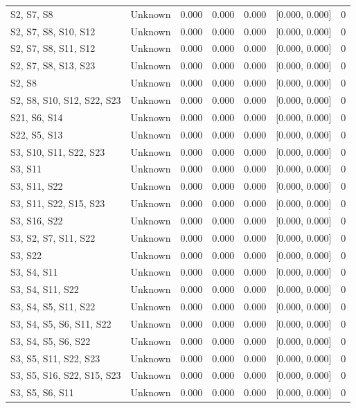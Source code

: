\begin{table}[h]
\begin{tabular}{llccccr}
S2, S7, S8 & Unknown & 0.000 & 0.000 & 0.000 & [0.000, 0.000] & 0 \\
S2, S7, S8, S10, S12 & Unknown & 0.000 & 0.000 & 0.000 & [0.000, 0.000] & 0 \\
S2, S7, S8, S11, S12 & Unknown & 0.000 & 0.000 & 0.000 & [0.000, 0.000] & 0 \\
S2, S7, S8, S13, S23 & Unknown & 0.000 & 0.000 & 0.000 & [0.000, 0.000] & 0 \\
S2, S8 & Unknown & 0.000 & 0.000 & 0.000 & [0.000, 0.000] & 0 \\
S2, S8, S10, S12, S22, S23 & Unknown & 0.000 & 0.000 & 0.000 & [0.000, 0.000] & 0 \\
S21, S6, S14 & Unknown & 0.000 & 0.000 & 0.000 & [0.000, 0.000] & 0 \\
S22, S5, S13 & Unknown & 0.000 & 0.000 & 0.000 & [0.000, 0.000] & 0 \\
S3, S10, S11, S22, S23 & Unknown & 0.000 & 0.000 & 0.000 & [0.000, 0.000] & 0 \\
S3, S11 & Unknown & 0.000 & 0.000 & 0.000 & [0.000, 0.000] & 0 \\
S3, S11, S22 & Unknown & 0.000 & 0.000 & 0.000 & [0.000, 0.000] & 0 \\
S3, S11, S22, S15, S23 & Unknown & 0.000 & 0.000 & 0.000 & [0.000, 0.000] & 0 \\
S3, S16, S22 & Unknown & 0.000 & 0.000 & 0.000 & [0.000, 0.000] & 0 \\
S3, S2, S7, S11, S22 & Unknown & 0.000 & 0.000 & 0.000 & [0.000, 0.000] & 0 \\
S3, S22 & Unknown & 0.000 & 0.000 & 0.000 & [0.000, 0.000] & 0 \\
S3, S4, S11 & Unknown & 0.000 & 0.000 & 0.000 & [0.000, 0.000] & 0 \\
S3, S4, S11, S22 & Unknown & 0.000 & 0.000 & 0.000 & [0.000, 0.000] & 0 \\
S3, S4, S5, S11, S22 & Unknown & 0.000 & 0.000 & 0.000 & [0.000, 0.000] & 0 \\
S3, S4, S5, S6, S11, S22 & Unknown & 0.000 & 0.000 & 0.000 & [0.000, 0.000] & 0 \\
S3, S4, S5, S6, S22 & Unknown & 0.000 & 0.000 & 0.000 & [0.000, 0.000] & 0 \\
S3, S5, S11, S22, S23 & Unknown & 0.000 & 0.000 & 0.000 & [0.000, 0.000] & 0 \\
S3, S5, S16, S22, S15, S23 & Unknown & 0.000 & 0.000 & 0.000 & [0.000, 0.000] & 0 \\
S3, S5, S6, S11 & Unknown & 0.000 & 0.000 & 0.000 & [0.000, 0.000] & 0 \\

\end{tabular}
\end{table}

